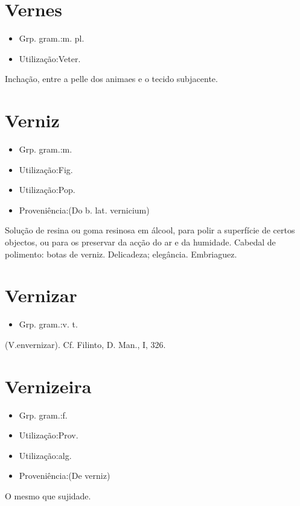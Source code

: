 \documentclass{article}
\begin{document}
\section{Vernes}
\begin{itemize}
\item {Grp. gram.:m. pl.}
\end{itemize}
\begin{itemize}
\item {Utilização:Veter.}
\end{itemize}
Inchação, entre a pelle dos animaes e o tecido subjacente.
\section{Verniz}
\begin{itemize}
\item {Grp. gram.:m.}
\end{itemize}
\begin{itemize}
\item {Utilização:Fig.}
\end{itemize}
\begin{itemize}
\item {Utilização:Pop.}
\end{itemize}
\begin{itemize}
\item {Proveniência:(Do b. lat. \textunderscore vernicium\textunderscore )}
\end{itemize}
Solução de resina ou goma resinosa em álcool, para polir a superfície de certos objectos, ou para os preservar da acção do ar e da humidade.
Cabedal de polimento: \textunderscore botas de verniz\textunderscore .
Delicadeza; elegância.
Embriaguez.
\section{Vernizar}
\begin{itemize}
\item {Grp. gram.:v. t.}
\end{itemize}
(V.envernizar). Cf. Filinto, \textunderscore D. Man.\textunderscore , I, 326.
\section{Vernizeira}
\begin{itemize}
\item {Grp. gram.:f.}
\end{itemize}
\begin{itemize}
\item {Utilização:Prov.}
\end{itemize}
\begin{itemize}
\item {Utilização:alg.}
\end{itemize}
\begin{itemize}
\item {Proveniência:(De \textunderscore verniz\textunderscore )}
\end{itemize}
O mesmo que \textunderscore sujidade\textunderscore .
\end{document}
